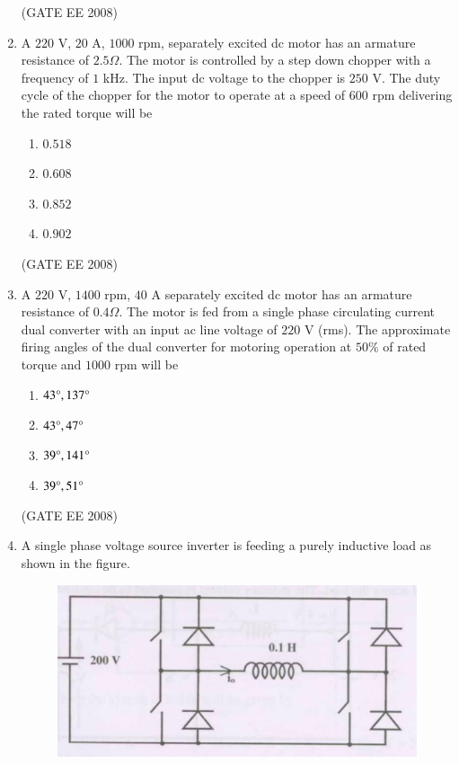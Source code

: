 \documentclass[journal,12pt,onecolumn]{IEEEtran}
\theoremstyle{remark}
\begin{document}
\begin{enumerate}[start=1, label=Q.\arabic*]
\begin{enumerate}
\end{enumerate}
\hfill (GATE EE 2008) \\[5mm]







\item A $220$ V, $20$ A, $1000$ rpm, separately excited dc motor has an armature resistance of $2.5 \Omega$. The motor is controlled by a step down chopper with a frequency of $1$ kHz. The input dc voltage to the chopper is $250$ V. The duty cycle of the chopper for the motor to operate at a speed of $600$ rpm delivering the rated torque will be

\begin{multicols}{4}
\begin{enumerate}
    \item $0.518$
    \item $0.608$
    \item $0.852$
    \item $0.902$
\end{enumerate}
\end{multicols}
\hfill (GATE EE 2008)

\item A $220$ V, $1400$ rpm, $40$ A separately excited dc motor has an armature resistance of $0.4 \Omega$. The motor is fed from a single phase circulating current dual converter with an input ac line voltage of $220$ V (rms). The approximate firing angles of the dual converter for motoring operation at $50\%$ of rated torque and $1000$ rpm will be

\begin{multicols}{4}
\begin{enumerate}
    \item $43\degree, 137\degree$
    \item $43\degree, 47\degree$
    \item $39\degree, 141\degree$
    \item $39\degree, 51\degree$
\end{enumerate}
\end{multicols}
\hfill (GATE EE 2008)


\item A single phase voltage source inverter is feeding a purely inductive load as shown in the figure.

\begin{figure}[H]
    \centering
    \includegraphics[width=\columnwidth]{Fig/q59.png}
    \caption{}
\end{figure}


\end{enumerate}
\end{document}
